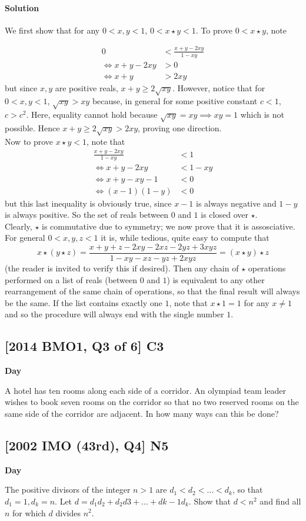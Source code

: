 \documentclass[10pt]{article}
\newcommand{\themonth}{March}
\newcommand{\theyear}{2019}
\newcounter{day}
\newcounter{solution}
\newcounter{datenumber}
\newcommand{\problem}[4][0]{
	\newpage
	\subsection{[#3] \space #2} \hfill 
	{\large\textbf{Day \arabic{day}}} %
	\begin{flushleft} #4 \end{flushleft}
	\vspace{1em}
	\addtocounter{day}{1}
	\addtocounter{datenumber}{1}
	\setcounter{solution}{1}
}
\newcommand{\anonsolution}[2][0]{
	\paragraph{Solution \arabic{solution}} 
	\begin{flushleft} #2 \end{flushleft}
	\addtocounter{solution}{1}
	\vspace{1em}
}
\begin{document}
\anonsolution[38]{We first show that for any \(0<x,y<1\), \(0<x\star y<1\). To prove \(0<x\star y\), note  

\begin{align*} 0&<\frac{x+y-2xy}{1-xy} \\ \iff x+y-2xy&>0 \\ \iff x+y&>2xy\end{align*} but since \(x,y\) are positive reals, \(x+y\geq 2\sqrt{xy}\). However, notice that for \(0<x,y<1\), \(\sqrt{xy}>xy\) because, in general for some positive constant \(c<1\), \(c>c^2\). Here, equality cannot hold because \(\sqrt{xy}=xy \implies xy=1\) which is not possible. Hence \(x+y\geq 2\sqrt{xy} > 2xy\), proving one direction. \\

Now to prove \(x\star y<1\), note that \begin{align*} \frac{x+y-2xy}{1-xy}&<1 \\ \iff x+y-2xy&<1-xy \\ \iff x+y-xy-1&<0 \\ \iff (x-1)(1-y)&< 0\end{align*} but this last inequality is obviously true, since \(x-1\) is always negative and \(1-y\) is always positive. So the set of reals between \(0\) and \(1\) is closed over \(\star\).  \\

Clearly, \(\star\) is commutative due to symmetry; we now prove that it is assosciative. For general \(0<x,y,z<1\) it is, while tedious, quite easy to compute that \[x \star (y\star z)=\frac{x+y+z-2xy-2xz-2yz+3xyz}{1-xy-xz-yz+2xyz} = (x\star y)\star z \] (the reader is invited to verify this if desired). Then any chain of \(\star\) operations performed on a list of reals (between \(0\) and \(1\)) is equivalent to any other rearrangement of the same chain of operations, so that the final result will always be the same. If the list contains exactly one \(1\), note that \(x\star 1=1\) for any \(x\neq 1\) and so the procedure will always end with the single number \(1\). } 

\problem[39]{C3}{2014 BMO1, Q3 of 6}{A hotel has ten rooms along each side of a corridor. An olympiad team leader wishes to book seven rooms on the corridor so that no two reserved rooms on the same side of the corridor are adjacent. In how many ways can this be done?}

\problem[40]{N5}{2002 IMO (43rd), Q4}{The positive divisors of the integer $n > 1$ are  $d_1 < d_2 < \dots < d_k$, so that $d_1 = 1, d_k = n$. Let $d = d_1d_2 + d_2d3 + \dots + d{k-1}d_k$. Show that $d < n^2$ and find all $n$ for which $d$ divides $n^2$.}
\end{document}
